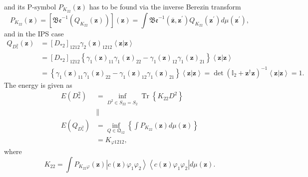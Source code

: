 \documentclass[aps,preprint]{revtex4}%
\begin{document}
and its P-symbol $P_{K_{22}}\left(  \mathbf{z}\right)  $ has to be found via
the inverse Berezin transform
\begin{equation}
P_{K_{22}}\left(  \mathbf{z}\right)  =\left[  \mathfrak{Be}^{-1}\left(
Q_{K_{22}}\left(  \mathbf{z}\right)  \right)  \right]  \left(  \mathbf{z}%
\right)  =\int\mathfrak{Be}^{-1}\left(  \mathbf{\bar{z},z}^{\prime}\right)
Q_{K_{22}}\left(  \mathbf{z}^{\prime}\right)  d\mu\left(  \mathbf{z}^{\prime
}\right)  ,
\end{equation}
and in the IPS case%
\begin{align}
Q_{D_{\ast}^{2}}\left(  \mathbf{z}\right)   &  =\left[  D_{\ast2}\right]
_{1212}\gamma_{2}\left(  \mathbf{z}\right)  _{1212}\left\langle \mathbf{z}%
\left\vert \mathbf{z}\right.  \right\rangle \nonumber\\
&  =\left[  D_{\ast2}\right]  _{1212}\left\{  \gamma_{1}\left(  \mathbf{z}%
\right)  _{11}\gamma_{1}\left(  \mathbf{z}\right)  _{22}-\gamma_{1}\left(
\mathbf{z}\right)  _{12}\gamma_{1}\left(  \mathbf{z}\right)  _{21}\right\}
\left\langle \mathbf{z}\left\vert \mathbf{z}\right.  \right\rangle \nonumber\\
&  =\left\{  \gamma_{1}\left(  \mathbf{z}\right)  _{11}\gamma_{1}\left(
\mathbf{z}\right)  _{22}-\gamma_{1}\left(  \mathbf{z}\right)  _{12}\gamma
_{1}\left(  \mathbf{z}\right)  _{21}\right\}  \left\langle \mathbf{z}%
\left\vert \mathbf{z}\right.  \right\rangle =\det\left(  \mathbb{I}%
_{2}+\mathbf{z}^{\dagger}\mathbf{z}\right)  ^{-1}\left\langle \mathbf{z}%
\left\vert \mathbf{z}\right.  \right\rangle =1.
\end{align}
The energy is given as
\begin{align}
E\left(  D_{\ast}^{2}\right)   &  =\inf_{D^{2}\in S_{22}=S_{2}}%
\operatorname*{Tr}\left\{  K_{22}D^{2}\right\} \nonumber\\
&  \parallel\nonumber\\
E\left(  Q_{D_{\ast}^{2}}\right)   &  =\inf_{Q\in\mathfrak{Q}_{12}}\left\{
\int P_{K_{22}}\left(  \mathbf{z}\right)  d\mu\left(  \mathbf{z}\right)
\right\} \nonumber\\
&  =K_{\varphi1212},
\end{align}
where%
\begin{equation}
K_{22}=\int P_{K_{22}\varphi}\left(  \mathbf{z}\right)  \left\vert c\left(
\mathbf{z}\right)  \varphi_{1}\varphi_{2}\right\rangle \left\langle c\left(
\mathbf{z}\right)  \varphi_{1}\varphi_{2}\right\vert d\mu\left(
\mathbf{z}\right)  .
\end{equation}
\end{document}
